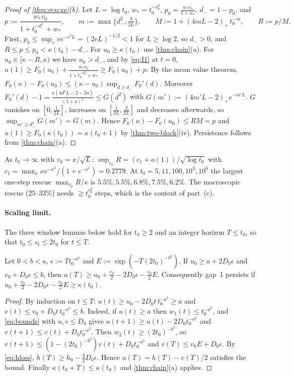 \begin{proof}[Proof of \cref{thm:rescue}(b)]
Let $L=\log t_0$, $w_*=t_0^{-v_0^2}$, $p_0=\frac{w_*v_0}{1+w_*}$, $d_-=1-p_0$, and
\[
p:=\frac{w_*v_0}{1+t_0^{-d_-^2}+w_*},\qquad m:=\max\{d_-^2,\tfrac3{2L}\},\qquad M:=1+(4mL-2)_+\,t_0^{-m},\qquad R:=p/M .
\]
First, $p_0\le\sup_vve^{-v^2L}=(2eL)^{-1/2}<1$ for $L\ge\log2$, so $d_->0$, and $R\le p\le p_0<\kappa(t_0)-d_-$. For $u_0\ge\kappa(t_0)$ use
\cref{thm:chain}(a). For $u_0\in[\kappa-R,\kappa)$ we have $u_0>d_-$, and by \eqref{eq:I1} at $t=0$,
$u(1)\ge F_0(u_0)+\frac{w_*v_0}{1+t_0^{-u_0^2}+w_*}\ge F_0(u_0)+p$. By the mean value theorem,
$F_0(\kappa)-F_0(u_0)\le(\kappa-u_0)\sup_{d\ge d_-}F_0'(d)$. Moreover $F_0'(d)-1=\frac{a(4d^2L-2-2a)}{(1+a)^2}\le G(d^2)$ with
$G(m'):=(4m'L-2)_+e^{-m'L}$. $G$ vanishes on $[0,\frac1{2L}]$, increases on $[\frac1{2L},\frac3{2L}]$ and decreases afterwards, so
$\sup_{m'\ge d_-^2}G(m')=G(m)$. Hence $F_0(\kappa)-F_0(u_0)\le RM=p$ and $u(1)\ge F_0(\kappa(t_0))=\kappa(t_0+1)$ by \cref{thm:two-block}(iv).
Persistence follows from \cref{thm:chain}(a).
\end{proof}

\begin{remark}
As $t_0\to\infty$ with $v_0=x/\sqrt L$: $\sup_{v_0}R=(c_1+o(1))/\sqrt{\log t_0}$ with $c_1=\max_xxe^{-x^2}/(1+e^{-x^2})=0.2779$. At
$t_0=5,11,100,10^3,10^6$ the largest one-step rescue $\max_{v_0}R/\kappa$ is $5.5\%,5.5\%,6.8\%,7.5\%,6.2\%$. The macroscopic rescue
($25$--$33\%$) needs $\gtrsim t_0^{v_0^2}$ steps, which is the content of part~(c).
\end{remark}

\paragraph{Scaling limit.} The three window lemmas below hold for $t_0\ge2$ and an integer horizon $T\le t_0$, so that $t_0\le s_t\le2t_0$ for
$t\le T$.

\begin{lemma}\label{lem:winP}
Let $0<b<a$, $\epsilon:=Tt_0^{-a^2}$ and $E:=\exp(-T(2t_0)^{-b^2})$. If $u_0\ge a+2D_0\epsilon$ and $v_0+D_0\epsilon\le b$, then
$u(T)\ge u_0+\frac{v_0}2-2D_0\epsilon-\frac{v_0}2E$. Consequently gap~1 persists if $u_0+\frac{v_0}2-2D_0\epsilon-\frac{v_0}2E\ge\kappa(t_0)$.
\end{lemma}
\begin{proof}
By induction on $t\le T$: $u(t)\ge u_0-2D_0t\,t_0^{-a^2}\ge a$ and $v(t)\le v_0+D_0t\,t_0^{-a^2}\le b$. Indeed, if $u(t)\ge a$ then
$w_1(t)\le t_0^{-a^2}$, and \eqref{eq:bounds} with $u,v\le D_0$ gives $u(t+1)\ge u(t)-2D_0t_0^{-a^2}$ and $v(t+1)\le v(t)+D_0t_0^{-a^2}$. Then
$w_2(t)\ge(2t_0)^{-b^2}$, so $v(t+1)\le(1-(2t_0)^{-b^2})v(t)+D_0t_0^{-a^2}$ and $v(T)\le v_0E+D_0\epsilon$. By \eqref{eq:hloss},
$h(T)\ge h_0-\frac32D_0\epsilon$. Hence $u(T)=h(T)-v(T)/2$ satisfies the bound. Finally $\kappa(t_0+T)\le\kappa(t_0)$ and
\cref{thm:chain}(a) applies.
\end{proof}

